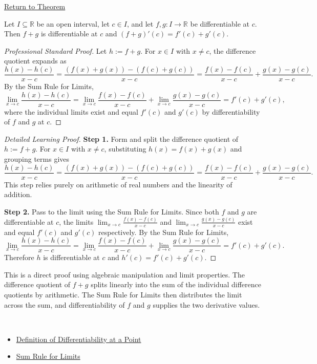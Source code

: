 \newpage
{}
\label{prf:sum-rule}

\begin{remark*}[Return]
\hyperref[thm:sum-rule]{Return to Theorem}
\end{remark*}

\begin{theorem*}
Let $I \subseteq \mathbb{R}$ be an open interval, let $c \in I$, and let $f, g : I \to \mathbb{R}$ be differentiable at $c$. Then $f + g$ is differentiable at $c$ and $(f + g)'(c) = f'(c) + g'(c)$.
\end{theorem*}

\begin{proof}[Professional Standard Proof]
\LRAProofBodyStart
Let $h := f + g$. For $x \in I$ with $x \neq c$, the difference quotient expands as
\[
  \frac{h(x) - h(c)}{x - c} = \frac{(f(x) + g(x)) - (f(c) + g(c))}{x - c} = \frac{f(x) - f(c)}{x - c} + \frac{g(x) - g(c)}{x - c}.
\]
By the Sum Rule for Limits,
\[
  \lim_{x \to c} \frac{h(x) - h(c)}{x - c} = \lim_{x \to c} \frac{f(x) - f(c)}{x - c} + \lim_{x \to c} \frac{g(x) - g(c)}{x - c} = f'(c) + g'(c),
\]
where the individual limits exist and equal $f'(c)$ and $g'(c)$ by differentiability of $f$ and $g$ at $c$.
\end{proof}

\begin{proof}[Detailed Learning Proof]
\LRAProofBodyStart

\textbf{Step 1.} Form and split the difference quotient of $h := f + g$. For $x \in I$ with $x \neq c$, substituting $h(x) = f(x) + g(x)$ and grouping terms gives
\[
  \frac{h(x) - h(c)}{x - c} = \frac{(f(x) + g(x)) - (f(c) + g(c))}{x - c} = \frac{f(x) - f(c)}{x - c} + \frac{g(x) - g(c)}{x - c}.
\]
This step relies purely on arithmetic of real numbers and the linearity of addition.

\textbf{Step 2.} Pass to the limit using the Sum Rule for Limits. Since both $f$ and $g$ are differentiable at $c$, the limits $\lim_{x \to c} \frac{f(x) - f(c)}{x - c}$ and $\lim_{x \to c} \frac{g(x) - g(c)}{x - c}$ exist and equal $f'(c)$ and $g'(c)$ respectively. By the Sum Rule for Limits,
\[
  \lim_{x \to c} \frac{h(x) - h(c)}{x - c} = \lim_{x \to c} \frac{f(x) - f(c)}{x - c} + \lim_{x \to c} \frac{g(x) - g(c)}{x - c} = f'(c) + g'(c).
\]
Therefore $h$ is differentiable at $c$ and $h'(c) = f'(c) + g'(c)$.
\end{proof}

\begin{remark*}
This is a direct proof using algebraic manipulation and limit properties. The difference quotient of $f + g$ splits linearly into the sum of the individual difference quotients by arithmetic. The Sum Rule for Limits then distributes the limit across the sum, and differentiability of $f$ and $g$ supplies the two derivative values.
\end{remark*}

\begin{remark*}[Dependencies]~\\
\begin{itemize}
  \item \hyperref[def:derivative-at-point]{Definition of Differentiability at a Point}
  \item \hyperref[thm:limit-sum]{Sum Rule for Limits}
\end{itemize}
\end{remark*}

\clearpage
